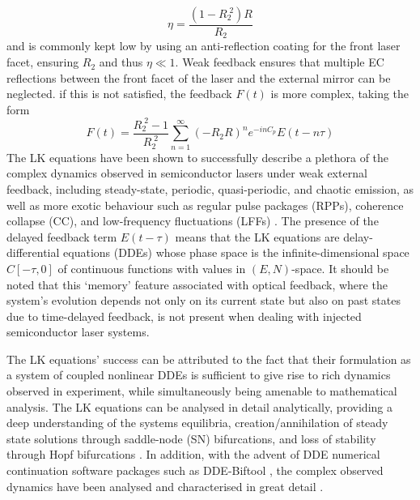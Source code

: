 %
\begin{equation}
    \eta = \frac{(1-R_2^{\;2})R}{R_2}
\end{equation}
%
and is commonly kept low by using an anti-reflection coating for the front laser facet, ensuring $R_2$ and thus $\eta \ll 1$. Weak feedback ensures that multiple EC reflections between the front facet of the laser and the external mirror can be neglected. if this is not satisfied, the feedback $F(t)$ is more complex, taking the form \cite{vantartwijk1995semiconductor}
%
\begin{equation}
\label{eq:multiple_EC}
    F(t) = \frac{R_2^{\;2} - 1}{R_2^{\;2}} \sum_{n=1}^\infty (-R_2 R)^n e^{-i n C_p} E(t-n \tau)
\end{equation}
%
The LK equations have been shown to successfully describe a plethora of the complex dynamics observed in semiconductor lasers under weak external feedback, including steady-state, periodic, quasi-periodic, and chaotic emission, as well as more exotic behaviour such as regular pulse packages (RPPs), coherence collapse (CC), and low-frequency fluctuations (LFFs) \cite{heil1998coexistence}. The presence of the delayed feedback term $E(t-\tau)$ means that the LK equations are delay-differential equations (DDEs) whose phase space is the infinite-dimensional space $C[-\tau, 0]$ of continuous functions with values in $(E,N)$-space. It should be noted that this `memory' feature associated with optical feedback, where the system's evolution depends not only on its current state but also on past states due to time-delayed feedback, is not present when dealing with injected semiconductor laser systems.
%
\par
%
The LK equations' success can be attributed to the fact that their formulation as a system of coupled nonlinear DDEs is sufficient to give rise to rich dynamics observed in experiment, while simultaneously being amenable to mathematical analysis. The LK equations can be analysed in detail analytically, providing a deep understanding of the systems equilibria, creation/annihilation of steady state solutions through saddle-node (SN) bifurcations, and loss of stability through Hopf bifurcations \cite{rottschafer2007ecm}. In addition, with the advent of DDE numerical continuation software packages such as DDE-Biftool \cite{sieber2014dde}, the complex observed dynamics have been analysed and characterised in great detail \cite{krauskopf2004dynamics}.
%
\par
%
